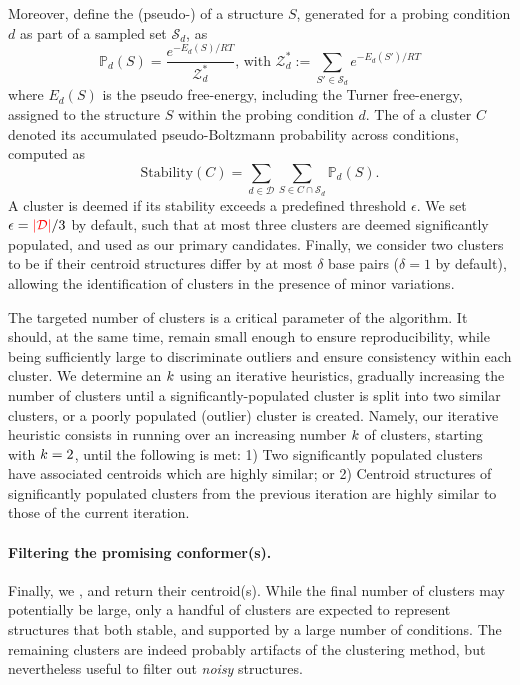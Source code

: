 \documentclass[a4,center,fleqn]{NAR}
\begin{document}
{Moreover, define the (pseudo-) of a structure $S$, generated for a probing condition $d$ as part of a sampled  set $\mathcal{S}_d$, as
$$\mathbb{P}_d(S) = \frac{e^{-E_d(S)/RT}}{\mathcal{Z}^*_d} \text{, with } \mathcal{Z}^*_d := \sum_{S'\in \mathcal{S}_d} e^{-E_d(S')/RT}$$
where $E_d(S)$ is the pseudo free-energy, including the Turner free-energy, assigned to the structure $S$ within the probing condition $d$.
The  of a cluster $C$ denoted its accumulated pseudo-Boltzmann probability across conditions, computed as
$$\text{Stability}(C) = \sum_{d\in \mathcal{D}} \sum_{S\in C\cap \mathcal{S}_d}  \mathbb{P}_d(S).$$
A cluster is deemed  if its stability exceeds a predefined threshold $\epsilon$. 
We set  $\epsilon ={\color{red} |\mathcal{D}|}/3$ by default, such that at most three clusters are deemed significantly populated, and used as our primary candidates.
Finally, we consider two clusters to be  if their centroid structures differ by at most $\delta$ base pairs ($\delta=1$ by default), allowing the identification of clusters in the presence of minor variations.




The targeted number of clusters is a critical parameter of the \CL{} algorithm. It should, at the same time, remain small enough to ensure reproducibility, while being sufficiently large to discriminate outliers and ensure consistency within each cluster. We determine an  $k$ using an iterative heuristics, gradually increasing the number of clusters until a significantly-populated cluster is split into two similar clusters, or a poorly populated (outlier) cluster is created.
Namely, our iterative heuristic consists in running \CL over an increasing number $k$ of clusters, starting with $k=2$, until the following  is met: 1) Two significantly populated clusters have associated centroids which are highly similar; or 2) Centroid structures of significantly populated clusters from the previous iteration are highly similar to those of the current iteration.}


\paragraph{Filtering the promising conformer(s).} Finally, we , and return their centroid(s). While the final number of clusters may potentially be large, only a handful of clusters are expected to represent structures that  both stable, and supported by a large number of conditions. The remaining clusters are indeed probably artifacts of the clustering method, but nevertheless useful to filter out \emph{noisy} structures. 
\end{document}
